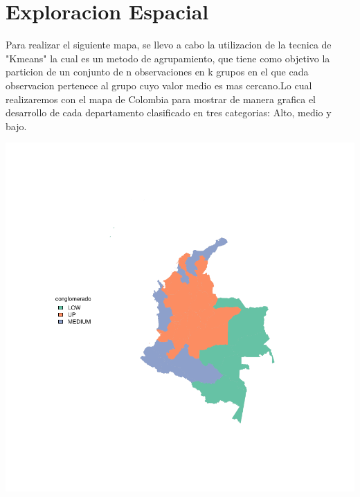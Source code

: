 \documentclass{article}
\begin{document}
\clearpage




\section{Exploracion Espacial}

Para realizar el siguiente mapa, se llevo a cabo la utilizacion de la tecnica de "Kmeans" la cual es un metodo de agrupamiento, que tiene como objetivo la particion de un conjunto de n observaciones en k grupos en el que cada observacion pertenece al grupo cuyo valor medio es mas cercano.Lo cual realizaremos con el mapa de Colombia para mostrar de manera grafica el desarrollo de cada departamento clasificado en tres categorias: Alto, medio y bajo. 





\includegraphics{Proyecto1111-plotMap1}


\renewcommand{\refname}{Bibliografia}

\end{document}
